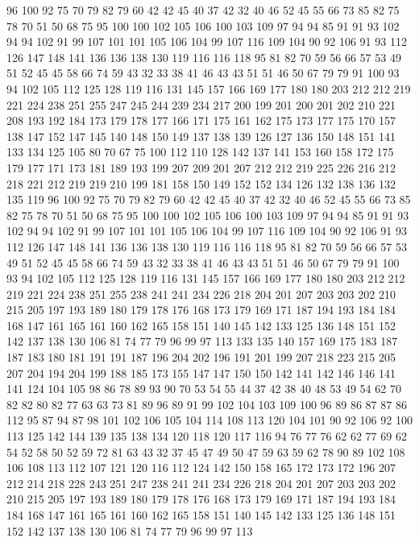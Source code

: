 96 100 92 75 70 79 82 79 60 42 42 45 40 37 42 32 40 46 52 45
55 66 73 85 82 75 78 70 51 50 68 75 95 100 100 102 105 106 100 103
109 97 94 94 85 91 91 93 102 94 94 102 91 99 107 101 101 105 106 104
99 107 116 109 104 90 92 106 91 93 112 126 147 148 141 136 136 138 130 119
116 116 118 95 81 82 70 59 56 66 57 53 49 51 52 45 45 58 66 74
59 43 32 33 38 41 46 43 43 51 51 46 50 67 79 79 91 100 93 94
102 105 112 125 128 119 116 131 145 157 166 169 177 180 180 203 212 212 219 221
224 238 251 255 247 245 244 239 234 217 200 199 201 200 201 202 210 221 208 193
192 184 173 179 178 177 166 171 175 161 162 175 173 177 175 170 157 138 147 152
147 145 140 148 150 149 137 138 139 126 127 136 150 148 151 141 133 134 125 105
80 70 67 75 100 112 110 128 142 137 141 153 160 158 172 175 179 177 171 173
181 189 193 199 207 209 201 207 212 212 219 225 226 216 212 218 221 212 219 219
210 199 181 158 150 149 152 152 134 126 132 138 136 132 135 119 96 100 92 75
70 79 82 79 60 42 42 45 40 37 42 32 40 46 52 45 55 66 73 85
82 75 78 70 51 50 68 75 95 100 100 102 105 106 100 103 109 97 94 94
85 91 91 93 102 94 94 102 91 99 107 101 101 105 106 104 99 107 116 109
104 90 92 106 91 93 112 126 147 148 141 136 136 138 130 119 116 116 118 95
81 82 70 59 56 66 57 53 49 51 52 45 45 58 66 74 59 43 32 33
38 41 46 43 43 51 51 46 50 67 79 79 91 100 93 94 102 105 112 125
128 119 116 131 145 157 166 169 177 180 180 203 212 212 219 221 224 238 251 255
238 241 241 234 226 218 204 201 207 203 203 202 210 215 205 197 193 189 180 179
178 176 168 173 179 169 171 187 194 193 184 184 168 147 161 165 161 160 162 165
158 151 140 145 142 133 125 136 148 151 152 142 137 138 130 106 81 74 77 79
96 99 97 113 133 135 140 157 169 175 183 187 187 183 180 181 191 191 187 196
204 202 196 191 201 199 207 218 223 215 205 207 204 194 204 199 188 185 173 155
147 147 150 150 142 141 142 146 146 141 141 124 104 105 98 86 78 89 93 90
70 53 54 55 44 37 42 38 40 48 53 49 54 62 70 82 82 80 82 77
63 63 73 81 89 96 89 91 99 102 104 103 109 100 96 89 86 87 87 86
112 95 87 94 87 98 101 102 106 105 104 114 108 113 120 104 101 90 92 106
92 100 113 125 142 144 139 135 138 134 120 118 120 117 116 94 76 77 76 62
62 77 69 62 54 52 58 50 52 59 72 81 63 43 32 37 45 47 49 50
47 59 63 59 62 78 90 89 102 108 106 108 113 112 107 121 120 116 112 124
142 150 158 165 172 173 172 196 207 212 214 218 228 243 251 247 238 241 241 234
226 218 204 201 207 203 203 202 210 215 205 197 193 189 180 179 178 176 168 173
179 169 171 187 194 193 184 184 168 147 161 165 161 160 162 165 158 151 140 145
142 133 125 136 148 151 152 142 137 138 130 106 81 74 77 79 96 99 97 113
